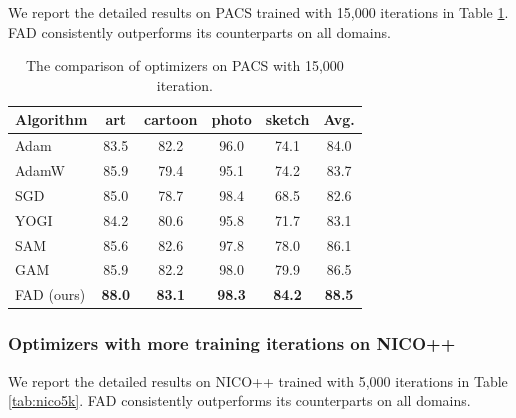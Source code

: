 We report the detailed results on PACS trained with 15,000 iterations in Table \ref{tab:pacs15k}. FAD consistently outperforms its counterparts on all domains.
\begin{table}[th]
\centering
\caption{The comparison of optimizers on PACS with 15,000 iteration.}
\begin{tabular}{lcccc|c}
% 
\toprule
\textbf{Algorithm} & art & cartoon & photo & sketch  & \textbf{Avg.} \\
\midrule

Adam  & 83.5  & 82.2 & 96.0 & 74.1 & 84.0 \\
AdamW  & 85.9  & 79.4  & 95.1 & 74.2 & 83.7 \\
SGD  & 85.0 & 78.7  & 98.4 & 68.5 & 82.6 \\
YOGI  & 84.2 & 80.6  & 95.8 & 71.7 & 83.1 \\
SAM  & 85.6 & 82.6  & 97.8 & 78.0 & 86.1 \\
GAM  & 85.9 &  82.2 & 98.0 & 79.9 & 86.5 \\

\midrule
FAD (ours) & \textbf{88.0} & \textbf{83.1}   & \textbf{98.3} & \textbf{84.2}  & \textbf{88.5} \\

\bottomrule
\end{tabular}
\label{tab:pacs15k}
\end{table}


\subsubsection{Optimizers with more training iterations on NICO++}
We report the detailed results on NICO++ trained with 5,000 iterations in Table \ref{tab:nico5k}. FAD consistently outperforms its counterparts on all domains.

